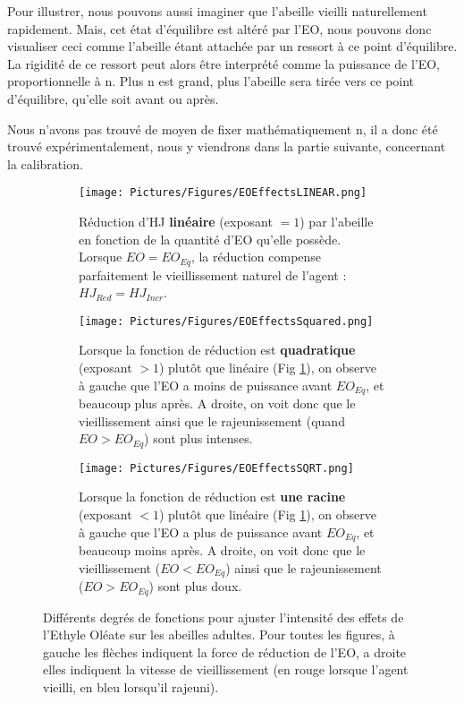 	Pour illustrer, nous pouvons aussi imaginer que l'abeille vieilli naturellement rapidement. Mais, cet état d'équilibre est altéré par l'EO, nous pouvons donc visualiser ceci comme l'abeille étant attachée par un ressort à ce point d'équilibre. La rigidité de ce ressort peut alors être interprété comme la puissance de l'EO, proportionnelle à n. Plus n est grand, plus l'abeille sera tirée vers ce point d'équilibre, qu'elle soit avant ou après.
	
	Nous n'avons pas trouvé de moyen de fixer mathématiquement n, il a donc été trouvé expérimentalement, nous y viendrons dans la partie suivante, concernant la calibration.
	
	\begin{figure}
	\centering
	
	\begin{subfigure}{\textwidth}
	\centering
	\texttt{[image: Pictures/Figures/EOEffectsLINEAR.png]}
	\caption{Réduction d'HJ \textbf{linéaire} (exposant $= 1$) par l'abeille en fonction de la quantité d'EO qu'elle possède. Lorsque $EO = EO_{Eq}$, la réduction compense parfaitement le vieillissement naturel de l'agent : $HJ_{Red} = HJ_{Incr}$.}
	\label{eoLinear}
	\end{subfigure}
	
	\begin{subfigure}{\textwidth}
	\centering
	\texttt{[image: Pictures/Figures/EOEffectsSquared.png]}
	\caption{Lorsque la fonction de réduction est \textbf{quadratique} (exposant $> 1$) plutôt que linéaire (Fig \ref{eoLinear}), on observe à gauche que l'EO a moins de puissance avant $EO_{Eq}$, et beaucoup plus après. A droite, on voit donc que le vieillissement ainsi que le rajeunissement (quand $EO > EO_{Eq}$) sont plus intenses.}
	\label{eoSquared}
	\end{subfigure}
	
	\begin{subfigure}{\textwidth}
	\centering
	\texttt{[image: Pictures/Figures/EOEffectsSQRT.png]}
	\caption{Lorsque la fonction de réduction est \textbf{une racine} (exposant $< 1$) plutôt que linéaire (Fig \ref{eoLinear}), on observe à gauche que l'EO a plus de puissance avant $EO_{Eq}$, et beaucoup moins après. A droite, on voit donc que le vieillissement ($EO < EO_{Eq}$) ainsi que le rajeunissement ($EO > EO_{Eq}$) sont plus doux.}
	\label{eoSqrt}	
	\end{subfigure}
	
	\caption[Différents degrés de fonctions pour ajuster l'intensité des effets de l'Ethyle Oléate sur les abeilles adultes.]{Différents degrés de fonctions pour ajuster l'intensité des effets de l'Ethyle Oléate sur les abeilles adultes. Pour toutes les figures, à gauche les flèches indiquent la force de réduction de l'EO, a droite elles indiquent la vitesse de vieillissement (en rouge lorsque l'agent vieilli, en bleu lorsqu'il rajeuni).}	
	\label{eoAll}
	\end{figure}
	
